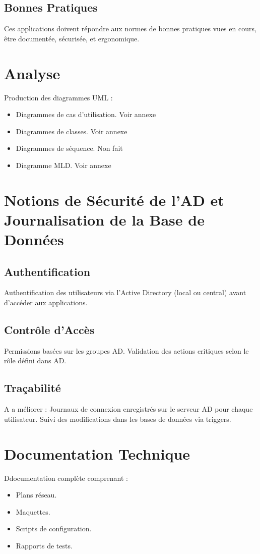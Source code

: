 \documentclass[a4paper,12pt]{report}
\begin{document}
\section{Bonnes Pratiques}
Ces applications doivent répondre aux normes de bonnes pratiques vues en cours, être documentée, sécurisée, et ergonomique.

\chapter{Analyse}
Production des diagrammes UML :
\begin{itemize}
    \item Diagrammes de cas d'utilisation. Voir annexe
    \item Diagrammes de classes. Voir annexe
    \item Diagrammes de séquence. Non fait
    \item Diagramme MLD. Voir annexe
\end{itemize}

\chapter{Notions de Sécurité de l'AD et Journalisation de la Base de Données}
\section{Authentification}
Authentification des utilisateurs via l'Active Directory (local ou central) avant d'accéder aux applications.

\section{Contrôle d'Accès}
Permissions basées sur les groupes AD. Validation des actions critiques selon le rôle défini dans AD.

\section{Traçabilité}
A a méliorer : 
Journaux de connexion enregistrés sur le serveur AD pour chaque utilisateur. Suivi des modifications dans les bases de données via triggers.

\chapter{Documentation Technique}
Ddocumentation complète comprenant :
\begin{itemize}
    \item Plans réseau.
    \item Maquettes.
    \item Scripts de configuration.
    \item Rapports de tests.
\end{itemize}
\end{document}
